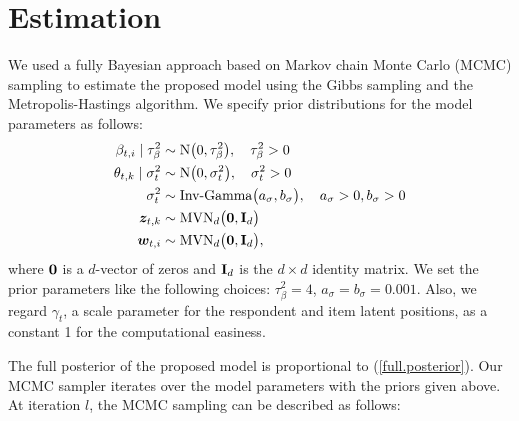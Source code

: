 \documentclass[a4paper, 11pt]{report}
\begin{document}
\chapter{Estimation} \label{Chapter5}
We used a fully Bayesian approach based on Markov chain Monte Carlo (MCMC) sampling to estimate the proposed model using the Gibbs sampling and the Metropolis-Hastings algorithm. We specify prior distributions for the model parameters as follows:
\[\begin{split}
    \beta_{t,i} \mid \tau_{\beta}^2 &\sim \mbox{N}\big(0, \tau_{\beta}^2\big), \quad \tau_{\beta}^2 > 0 \\
    \theta_{t,k} \mid \sigma^2_t &\sim \mbox{N}\big(0, \sigma_t^2\big), \quad \sigma_t^2 > 0 \\
    \sigma_t^2 &\sim \mbox{Inv-Gamma}\big(a_{\sigma}, b_{\sigma}\big), \quad a_{\sigma} > 0, b_{\sigma} > 0 \\
    \boldsymbol{z}_{t,k} &\sim \mbox{MVN}_d\big({\bf 0}, {\bf I}_d\big)\\
    \boldsymbol{w}_{t,i} &\sim \mbox{MVN}_d\big({\bf 0}, {\bf I}_d\big),\\
\end{split}\]
where ${\bf 0}$ is a $d$-vector of zeros and ${\bf I}_d$ is the $d \times d$ identity matrix. We set the prior parameters like the following choices: $\tau_{\beta}^2 = 4$, $a_{\sigma} = b_{\sigma} = 0.001$. Also, we regard $\gamma_t$, a scale parameter for the respondent and item latent positions, as a constant 1 for the computational easiness.

\quad The full posterior of the proposed model is proportional to (\ref{full.posterior}). Our MCMC sampler iterates over the model parameters with the priors given above. At iteration $l$, the MCMC sampling can be described as follows:
\end{document}
